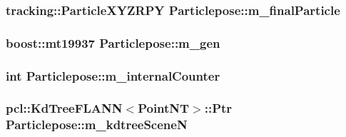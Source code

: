 \hypertarget{class_particlepose_ac013ac13e2a6c5a676714a4a9bccd8c1}{
\subsubsection[{m\-\_\-final\-Particle}]{\setlength{\rightskip}{0pt plus 5cm}tracking\-::\-Particle\-X\-Y\-Z\-R\-P\-Y {\bf \-Particlepose\-::m\-\_\-final\-Particle}}}\label{class_particlepose_ac013ac13e2a6c5a676714a4a9bccd8c1}
\hypertarget{class_particlepose_a0449123f3b8952410023d15b202be7a5}{
\subsubsection[{m\-\_\-gen}]{\setlength{\rightskip}{0pt plus 5cm}boost\-::mt19937 {\bf \-Particlepose\-::m\-\_\-gen}}}\label{class_particlepose_a0449123f3b8952410023d15b202be7a5}
\hypertarget{class_particlepose_aa4b1d0fe4fc48e68039ee1e9b2cb93dd}{
\subsubsection[{m\-\_\-internal\-Counter}]{\setlength{\rightskip}{0pt plus 5cm}int {\bf \-Particlepose\-::m\-\_\-internal\-Counter}}}\label{class_particlepose_aa4b1d0fe4fc48e68039ee1e9b2cb93dd}
\hypertarget{class_particlepose_ad68d6c6cb6c98cd908a3e9e903fdbac5}{
\subsubsection[{m\-\_\-kdtree\-Scene\-N}]{\setlength{\rightskip}{0pt plus 5cm}pcl\-::\-Kd\-Tree\-F\-L\-A\-N\-N$<${\bf \-Point\-N\-T}$>$\-::\-Ptr {\bf \-Particlepose\-::m\-\_\-kdtree\-Scene\-N}}}\label{class_particlepose_ad68d6c6cb6c98cd908a3e9e903fdbac5}
